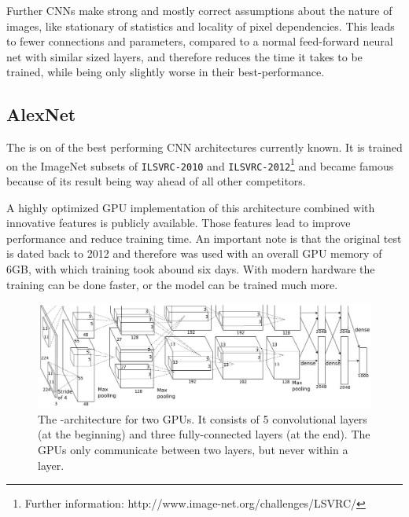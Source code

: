 Further CNNs make strong and mostly correct assumptions about the nature of images, like stationary of statistics and locality of pixel dependencies. This leads to fewer connections and parameters, compared to a normal feed-forward neural net with similar sized layers, and therefore reduces the time it takes to be trained, while being only slightly worse in their best-performance. \cite{krizhevsky2012imagenet}




\subsection{AlexNet} \label{subsec: AlexNet}

The \textit{\alexnet} is on of the best performing CNN architectures currently known. It is trained on the ImageNet subsets of \texttt{ILSVRC-2010} and \texttt{ILSVRC-2012}\footnote{Further information: http://www.image-net.org/challenges/LSVRC/} and became famous because of its result being way ahead of all other competitors.

A highly optimized GPU implementation of this architecture combined with innovative features is publicly available. Those features lead to improve performance and reduce training time.
An important note is that the original test is dated back to 2012 and therefore was used with an overall GPU memory of 6GB, with which training took abound six days. With modern hardware the training can be done faster, or the model can be trained much more. \cite{krizhevsky2012imagenet}


\begin{figure}[ht]
	\includegraphics[scale = 0.5]{src/pic/AlexNet-structure.PNG}
	\caption{The \alexnet-architecture for two GPUs. It consists of 5 convolutional layers (at the beginning) and three fully-connected layers (at the end). The GPUs only communicate between two layers, but never within a layer.\cite{krizhevsky2012imagenet}}
	\label{pic: AlexNet}
\end{figure}

